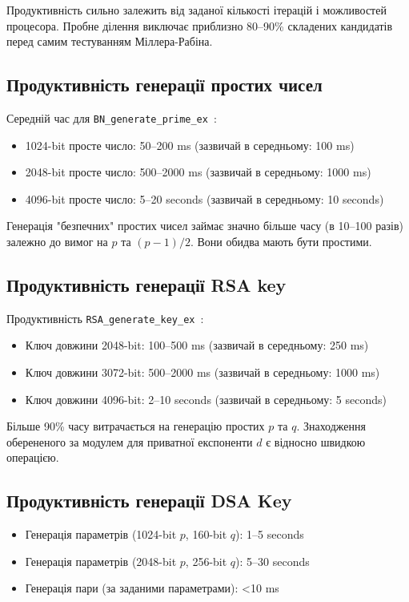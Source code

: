 Продуктивність сильно залежить від заданої кількості ітерацій і можливостей процесора. Пробне ділення виключає 
приблизно 80--90\% складених кандидатів перед самим тестуванням Міллера-Рабіна.

\subsection{Продуктивність генерації простих чисел}
Середній час для \texttt{BN\_generate\_prime\_ex}~\cite{menezes1996handbook}:
\begin{itemize}
    \item 1024-bit просте число: 50--200 ms (зазвичай в середньому: 100 ms)
    \item 2048-bit просте число: 500--2000 ms (зазвичай в середньому: 1000 ms)
    \item 4096-bit просте число: 5--20 seconds (зазвичай в середньому: 10 seconds)
\end{itemize}

Генерація "безпечних"{} простих чисел займає значно більше часу (в 10--100 разів) залежно до вимог на $p$ та 
$(p-1)/2$. Вони обидва мають бути простими.

\subsection{Продуктивність генерації RSA key}
Продуктивність \texttt{RSA\_generate\_key\_ex}~\cite{rivest1978method}:
\begin{itemize}
    \item Ключ довжини 2048-bit: 100--500 ms (зазвичай в середньому: 250 ms)
    \item Ключ довжини 3072-bit: 500--2000 ms (зазвичай в середньому: 1000 ms)
    \item Ключ довжини 4096-bit: 2--10 seconds (зазвичай в середньому: 5 seconds)
\end{itemize}

Більше 90\% часу витрачається на генерацію простих $p$ та $q$. Знаходження оберененого за модулем для приватної експоненти 
$d$ є відносно швидкою операцією.

\subsection{Продуктивність генерації DSA Key}
\begin{itemize}
    \item Генерація параметрів (1024-bit $p$, 160-bit $q$): 1--5 seconds
    \item Генерація параметрів (2048-bit $p$, 256-bit $q$): 5--30 seconds
    \item Генерація пари (за заданими параметрами): <10 ms
\end{itemize}

